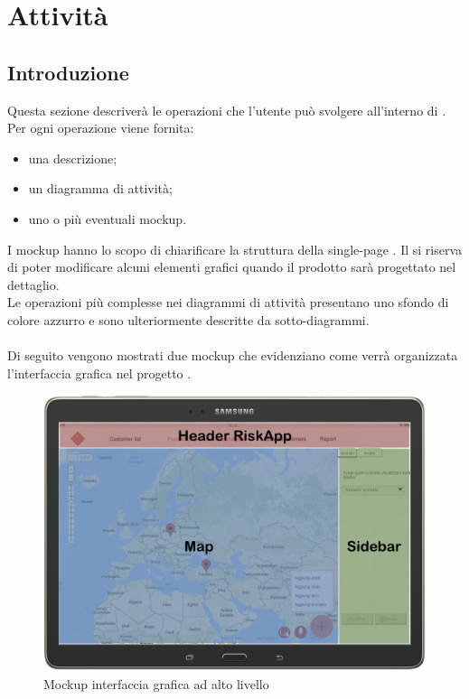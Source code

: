 \newpage
\section{Attività}
\subsection{Introduzione}
Questa sezione descriverà le operazioni che l'utente può svolgere all'interno di \progetto.
\\Per ogni operazione viene fornita:
\begin{itemize}
	\item una descrizione;
	\item un diagramma di attività;
	\item uno o più eventuali mockup.
\end{itemize}
I mockup hanno lo scopo di chiarificare la struttura della single-page \progetto. Il  si riserva di poter modificare alcuni elementi grafici quando il prodotto sarà progettato nel dettaglio.
\\Le operazioni più complesse nei diagrammi di attività presentano uno sfondo di colore azzurro e sono ulteriormente descritte da sotto-diagrammi. \\ \\
%
Di seguito vengono mostrati due mockup che evidenziano come verrà organizzata l'interfaccia grafica nel progetto \progetto.
\begin{figure}[H]
	\centering
	\includegraphics[scale=0.4]{img/MockUp/MockupConLayerHi}
	\caption{Mockup interfaccia grafica ad alto livello}
\end{figure}

